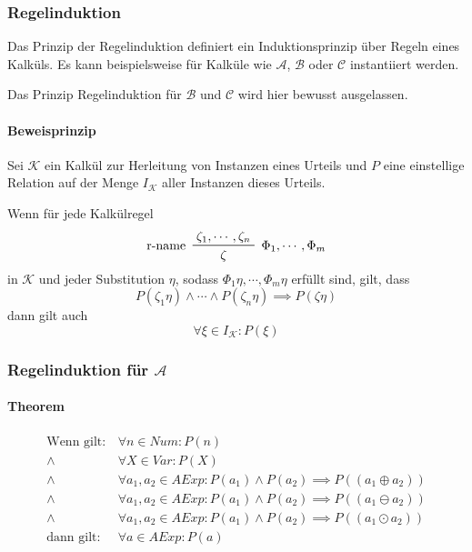 			    \subsubsection{Regelinduktion}
				    Das Prinzip der Regelinduktion definiert ein Induktionsprinzip über Regeln eines Kalküls. Es kann beispielsweise für Kalküle wie $ \mathcal{A} $, $ \mathcal{B} $ oder $ \mathcal{C} $ instantiiert werden.
				    
				    Das Prinzip Regelinduktion für $ \mathcal{B} $ und $ \mathcal{C} $ wird hier bewusst ausgelassen.
				    
				    \paragraph{Beweisprinzip}
					    Sei $ \mathcal{K} $ ein Kalkül zur Herleitung von Instanzen eines Urteils und $ P $ eine einstellige Relation auf der Menge $ I _ \mathcal{K} $ aller Instanzen dieses Urteils.
					    
					    Wenn für jede Kalkülregel
					    \begin{equation*}
						    \prftree[l, r]
							    { $ \Phi _ 1, \cdots, \Phi _ m $ }
							    { r-name }
							    { \zeta _ 1, \cdots, \zeta _ n }
							    { \zeta }
					    \end{equation*}
					    in $ \mathcal{K} $ und jeder Substitution $ \eta $, sodass $ \Phi _ 1 \eta, \cdots, \Phi _ m \eta $ erfüllt sind, gilt, dass
					    \begin{equation*}
						    P(\zeta _ 1 \eta) \land \cdots \land P(\zeta _ n \eta) \implies P(\zeta\eta)
					    \end{equation*}
					    dann gilt auch
						\begin{equation*}
							\forall \xi \in I _ \mathcal{K} : P(\xi)
						\end{equation*}
			    
			    \subsubsection{Regelinduktion für $ \mathcal{A} $}
				    \paragraph{Theorem}
					    \begin{align*}
						    \text{Wenn gilt:} & \,\forall n \in \textit{Num} : P(n) \\
						    \land & \,\forall X \in \textit{Var} : P(X) \\
						    \land & \,\forall a _ 1, a _ 2 \in \textit{AExp} : P(a _ 1) \land P(a _ 2) \implies P((a _ 1 \oplus a _ 2)) \\
						    \land & \,\forall a _ 1, a _ 2 \in \textit{AExp} : P(a _ 1) \land P(a _ 2) \implies P((a _ 1 \ominus a _ 2)) \\
						    \land & \,\forall a _ 1, a _ 2 \in \textit{AExp} : P(a _ 1) \land P(a _ 2) \implies P((a _ 1 \odot a _ 2)) \\
						    \text{dann gilt:} & \,\forall a \in \textit{AExp} : P(a) \\
					    \end{align*}
					    
